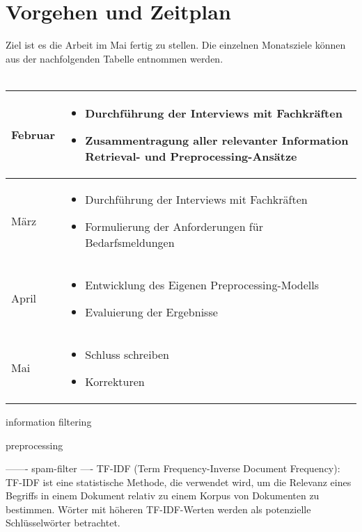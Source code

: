 \documentclass[a4paper,12pt]{scrreprt}
\newcommand{\hiddenchapter}[1]{
	\chapter*{{#1}}
}
\begin{document}
\hiddenchapter{Vorgehen und Zeitplan}
Ziel ist es die Arbeit im Mai fertig zu stellen. Die einzelnen Monatsziele können aus der nachfolgenden Tabelle entnommen werden. \\ \\
\begin{tabularx}{1\textwidth} { 
		| >{\raggedright\arraybackslash}X 
		| >{\raggedright\arraybackslash}X | }
	\hline
	Februar
	& \begin{itemize}
		\item Durchführung der Interviews mit Fachkräften
		\item Zusammentragung aller relevanter Information Retrieval- und Preprocessing-Ansätze 
	\end{itemize}\\
	\hline
	März
	& \begin{itemize}
		\item Durchführung der Interviews mit Fachkräften
		\item Formulierung der Anforderungen für Bedarfsmeldungen
	\end{itemize}\\
	\hline
	April
	& \begin{itemize}
		\item Entwicklung des Eigenen Preprocessing-Modells
		\item Evaluierung der Ergebnisse
	\end{itemize}\\
	\hline
	Mai
	& \begin{itemize}
		\item Schluss schreiben
		\item Korrekturen
	\end{itemize}\\
	\hline
\end{tabularx}
\newpage

\renewcommand\contentsname{Aufbau der Arbeit}
\tableofcontents

\cite{kobayashi2000information}

\cite{singhal2001modern}

\cite{croft2000combining}

\cite{horesh2016information}

\cite{belkin1992information}

information filtering
\cite{lanquillon2001enhancing}

preprocessing
\cite{alasadi2017review}

-------
spam-filter
\cite{shafi2017review}
\cite{khorsi2007overview}
\cite{tretyakov2004machine}
----
TF-IDF (Term Frequency-Inverse Document Frequency): TF-IDF ist eine statistische Methode, die verwendet wird, um die Relevanz eines Begriffs in einem Dokument relativ zu einem Korpus von Dokumenten zu bestimmen. Wörter mit höheren TF-IDF-Werten werden als potenzielle Schlüsselwörter betrachtet.
\cite{bafna2016document}
\cite{ramos2003using}
\end{document}
